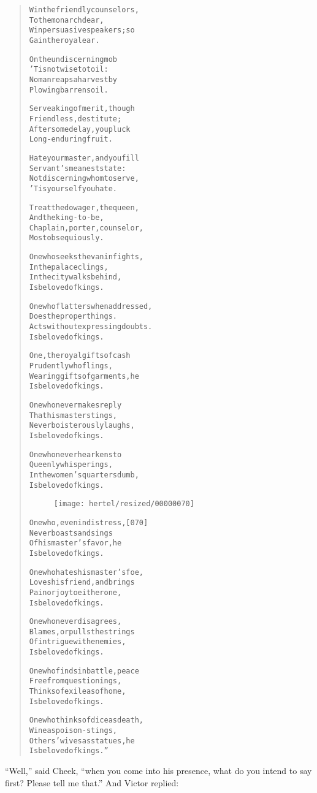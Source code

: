 \documentclass[article, twoside, 10pt]{memoir}
\renewenvironment{verbatim}{%
\begin{quote}%
\vskip -10pt%
\begin{alltt}\normalfont\small}{\end{alltt}%
\end{quote}%
\vskip -10pt
} %
\begin{document}
\begin{verbatim}
Win the friendly counselors,
    To the monarch dear,
Win persuasive speakers; so
    Gain the royal ear.

On the undiscerning mob
    'Tis not wise to toil:
No man reaps a harvest by
    Plowing barren soil.

Serve a king of merit, though
    Friendless, destitute;
After some delay, you pluck
    Long-enduring fruit.

Hate your master, and you fill
    Servant's meanest state:
Not discerning whom to serve,
    'Tis yourself you hate.

Treat the dowager, the queen,
    And the king-to-be,
Chaplain, porter, counselor,
    Most obsequiously.

One who seeks the van in fights,
    In the palace clings,
In the city walks behind,
    Is beloved of kings.

One who flatters when addressed,
    Does the proper things.
Acts without expressing doubts.
    Is beloved of kings.

One, the royal gifts of cash
    Prudently who flings,
Wearing gifts of garments, he
    Is beloved of kings.

One who never makes reply
    That his master stings,
Never boisterously laughs,
    Is beloved of kings.

One who never hearkens to
    Queenly whisperings,
In the women's quarters dumb,
    Is beloved of kings.

\begin{figure}[p]\texttt{[image: hertel/resized/00000070]}\end{figure}One who, even in distress,                              [070]
    Never boasts and sings
Of his master's favor, he
    Is beloved of kings.

One who hates his master's foe,
    Loves his friend, and brings
Pain or joy to either one,
    Is beloved of kings.

One who never disagrees,
    Blames, or pulls the strings
Of intrigue with enemies,
    Is beloved of kings.

One who finds in battle, peace
    Free from questionings,
Thinks of exile as of home,
    Is beloved of kings.

One who thinks of dice as death,
    Wine as poison-stings,
Others' wives as statues, he
    Is beloved of kings.”
\end{verbatim}
``Well,'' said Cheek,
``when you come into his presence, what do you intend to say first? Please tell me that.''
And Victor replied:
\end{document}
